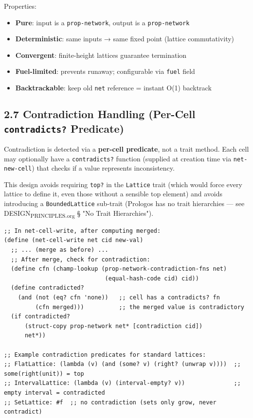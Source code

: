 \documentclass[11pt]{article}
\begin{document}
Properties:
\begin{itemize}
\item \textbf{Pure}: input is a \texttt{prop-network}, output is a \texttt{prop-network}
\item \textbf{Deterministic}: same inputs → same fixed point (lattice commutativity)
\item \textbf{Convergent}: finite-height lattices guarantee termination
\item \textbf{Fuel-limited}: prevents runaway; configurable via \texttt{fuel} field
\item \textbf{Backtrackable}: keep old \texttt{net} reference = instant O(1) backtrack
\end{itemize}
\subsection{2.7 Contradiction Handling (Per-Cell \texttt{contradicts?} Predicate)}
\label{sec:org8565b1c}

Contradiction is detected via a \textbf{per-cell predicate}, not a trait method.
Each cell may optionally have a \texttt{contradicts?} function (supplied at creation
time via \texttt{net-new-cell}) that checks if a value represents inconsistency.

This design avoids requiring \texttt{top?} in the \texttt{Lattice} trait (which would force
every lattice to define it, even those without a sensible top element) and
avoids introducing a \texttt{BoundedLattice} sub-trait (Prologos has no trait
hierarchies — see DESIGN\textsubscript{PRINCIPLES.org} § "No Trait Hierarchies").

\begin{verbatim}
;; In net-cell-write, after computing merged:
(define (net-cell-write net cid new-val)
  ;; ... (merge as before) ...
  ;; After merge, check for contradiction:
  (define cfn (champ-lookup (prop-network-contradiction-fns net)
                             (equal-hash-code cid) cid))
  (define contradicted?
    (and (not (eq? cfn 'none))   ;; cell has a contradicts? fn
         (cfn merged)))          ;; the merged value is contradictory
  (if contradicted?
      (struct-copy prop-network net* [contradiction cid])
      net*))

;; Example contradiction predicates for standard lattices:
;; FlatLattice: (lambda (v) (and (some? v) (right? (unwrap v))))  ;; some(right(unit)) = top
;; IntervalLattice: (lambda (v) (interval-empty? v))              ;; empty interval = contradicted
;; SetLattice: #f  ;; no contradiction (sets only grow, never contradict)
\end{verbatim}
\end{document}
